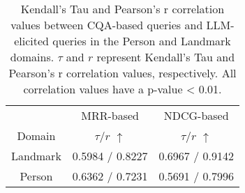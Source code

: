 \begin{table}[]
\centering
\begin{tabular}{c|cc}
   & \multicolumn{1}{c}{MRR-based} & \multicolumn{1}{c}{NDCG-based} \\
   Domain & $\tau$/$r$ $\uparrow$ & $\tau$/$r$ $\uparrow$ \\
   \hline
   Landmark & 0.5984 / 0.8227 & 0.6967 / 0.9142  \\
Person & 0.6362 / 0.7231 & 0.5691 / 0.7996  
\end{tabular}
\caption{
Kendall's Tau and Pearson's r correlation values between CQA-based queries and LLM-elicited queries in the Person and Landmark domains.
$\tau$ and $r$ represent Kendall's Tau and Pearson's r correlation values, respectively. All correlation values have a p-value < 0.01.
}
\label{tab:person-landmark-correlation}
\vspace{-10pt}
\end{table}